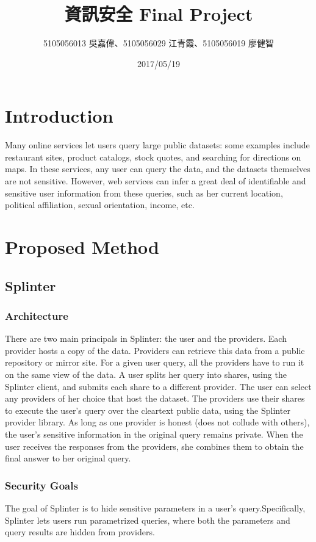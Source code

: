 \documentclass[12pt,a4paper]{article}
\title{\huge 資訊安全 Final Project} %
\author{5105056013 吳嘉偉、5105056029 江青霞、5105056019 廖健智} %
\date{2017/05/19} %
\begin{document}
\clearpage
\maketitle %

\begin{multicols}{2}

\section{Introduction}
Many online services let users query large public 
datasets: some examples include restaurant sites, 
product catalogs, stock quotes, and searching for 
directions on maps. In these services, any user can 
query the data, and the datasets themselves are not 
sensitive. However, web services can infer a great 
deal of identifiable and sensitive user information 
from these queries, such as her current location, 
political affiliation, sexual orientation, income, 
etc.
		
\section{Proposed Method}
\subsection{Splinter}
\subsubsection{Architecture}
There are two main principals in Splinter: the user 
and the providers. Each provider hosts a copy of 
the data. Providers can retrieve this data from a 
public repository or mirror site. For a given user 
query, all the providers have to run it on the same 
view of the data. 
  A user splits her query into shares, using the 
Splinter client, and submits each share to a 
different provider. The user can select any 
providers of her choice that host the dataset. The 
providers use their shares to execute the user’s 
query over the cleartext public data, using the 
Splinter provider library. As long as one provider 
is honest (does not collude with others), the 
user’s sensitive information in the original query 
remains private. When the user receives the 
responses from the providers, she combines them to 
obtain the final answer to her original query.

\subsubsection{Security Goals}
The goal of Splinter is to hide sensitive
parameters in a user’s query.Specifically, Splinter 
lets users run parametrized queries, where both the 
parameters and query results are hidden from 
providers.


\end{multicols}
\end{document}
